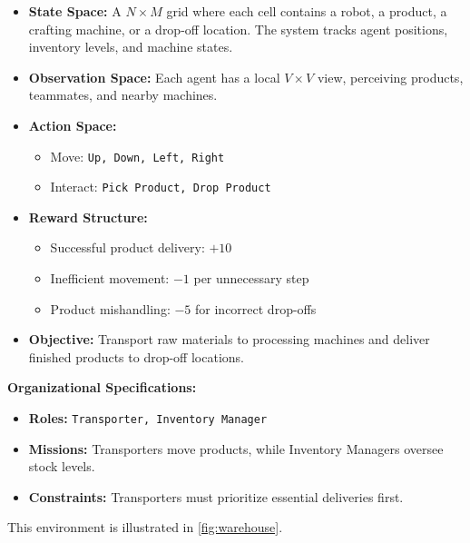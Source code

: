 \documentclass[pdflatex,sn-mathphys-num]{sn-jnl}%
\theoremstyle{thmstyleone}%
\theoremstyle{thmstyletwo}%
\theoremstyle{thmstylethree}%
\begin{document}
\begin{itemize}
    \item \textbf{State Space:} A $N \times M$ grid where each cell contains a robot, a product, a crafting machine, or a drop-off location. The system tracks agent positions, inventory levels, and machine states.
    \item \textbf{Observation Space:} Each agent has a local $V \times V$ view, perceiving products, teammates, and nearby machines.
    \item \textbf{Action Space:} 
    \begin{itemize}
        \item Move: \texttt{Up, Down, Left, Right}
        \item Interact: \texttt{Pick Product, Drop Product}
    \end{itemize}
    \item \textbf{Reward Structure:}
    \begin{itemize}
        \item Successful product delivery: $+10$
        \item Inefficient movement: $-1$ per unnecessary step
        \item Product mishandling: $-5$ for incorrect drop-offs
    \end{itemize}
    \item \textbf{Objective:} Transport raw materials to processing machines and deliver finished products to drop-off locations.
\end{itemize}

\textbf{Organizational Specifications:} 
\begin{itemize}
    \item \textbf{Roles:} \texttt{Transporter, Inventory Manager}
    \item \textbf{Missions:} Transporters move products, while Inventory Managers oversee stock levels.
    \item \textbf{Constraints:} Transporters must prioritize essential deliveries first.
\end{itemize}

This environment is illustrated in \autoref{fig:warehouse}.
\end{document}
